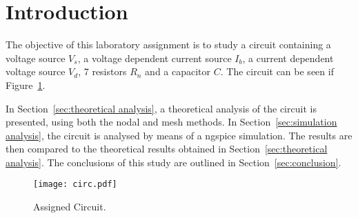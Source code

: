 \section{Introduction}
\label{sec:introduction}

The objective of this laboratory assignment is to study a circuit containing a voltage source $V_s$, 
a voltage dependent current source $I_b$, a current dependent voltage source 
$V_d$, 7 resistors $R_n$ and a capacitor $C$. The circuit can be seen if Figure~\ref{fig:circuit}.

In Section~\ref{sec:theoretical analysis}, a theoretical analysis of the circuit is
presented, using both the nodal and mesh methods. In Section~\ref{sec:simulation analysis}, the circuit is analysed by
means of a ngspice simulation. The results are then compared to the theoretical results obtained in
Section~\ref{sec:theoretical analysis}. The conclusions of this study are outlined in
Section~\ref{sec:conclusion}.

\vspace{1.0cm}

\begin{figure}[h!] \centering
	\texttt{[image: circ.pdf]}
	\caption{Assigned Circuit.}
	\label{fig:circuit}
\end{figure}